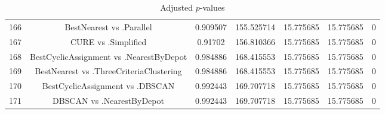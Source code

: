 \documentclass[a4paper,10pt]{article}
\begin{document}
\begin{landscape}
\begin{table}[!htp]
\begin{tabular}{ccccccc}
166&BestNearest vs .Parallel&0.909507&155.525714&15.775685&15.775685&0\\
167&CURE vs .Simplified&0.91702&156.810366&15.775685&15.775685&0\\
168&BestCyclicAssignment vs .NearestByDepot&0.984886&168.415553&15.775685&15.775685&0\\
169&BestNearest vs .ThreeCriteriaClustering&0.984886&168.415553&15.775685&15.775685&0\\
170&BestCyclicAssignment vs .DBSCAN&0.992443&169.707718&15.775685&15.775685&0\\
171&DBSCAN vs .NearestByDepot&0.992443&169.707718&15.775685&15.775685&0\\
\hline
\end{tabular}
\caption{Adjusted $p$-values}
\end{table}

\end{landscape}
\end{document}
